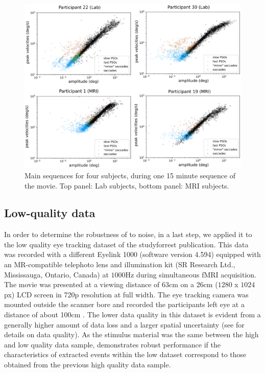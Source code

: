 \begin{figure}[h!]
    \includegraphics[width=1\textwidth]{img/main_sequences.eps}
    \caption{Main sequences for four subjects, during one 15 minute sequence of
    the movie. Top panel: Lab subjects, bottom panel: MRI subjects.}
    \label{fig:mains}
\end{figure}

\subsection*{Low-quality data}\label{ana_3}

In order to determine the robustness of \remodnav to noise, in a last step, we applied it to the low quality eye
tracking dataset of the studyforrest publication. This data was recorded with a different Eyelink 1000 (software
version 4.594) equipped with an MR-compatible telephoto lens and illumination kit (SR Research Ltd., Mississauga,
Ontario, Canada) at $1000$Hz during simultaneous fMRI acquisition. The movie was presented at a viewing distance
of $63$cm on a 26cm ($1280$ x $1024$px) LCD screen in 720p resolution at full width. The eye tracking camera was
mounted outside the scanner bore and recorded the participants left eye at a distance of about 100cm \citep{Hanke2016}.
The lower data quality in this dataset is evident from a generally higher amount of data loss and a larger spatial
uncertainty (see \citet{Hanke2016} for details on data quality). As the stimulus material was the same between
the high and low quality data sample, \remodnav demonstrates robust performance if the characteristics of
extracted events within the low dataset correspond to those obtained from the previous high quality data sample.

